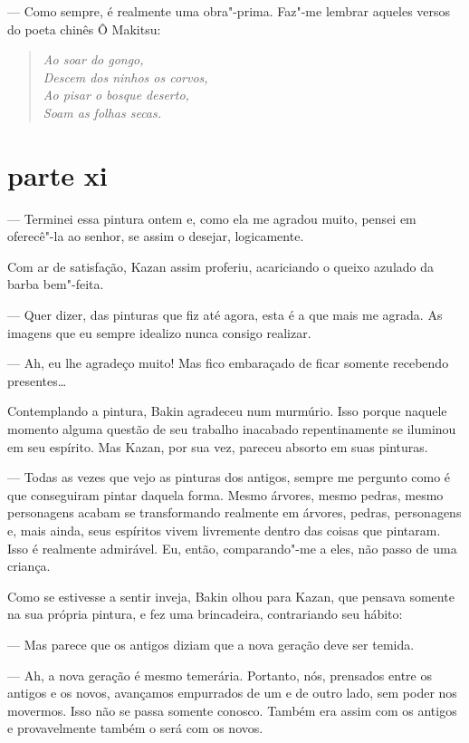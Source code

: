 --- Como sempre, é realmente uma obra"-prima. Faz"-me lembrar aqueles versos
do poeta chinês Ô Makitsu:

\begin{verse}
\textit{Ao soar do gongo,\\
Descem dos ninhos os corvos,\\
Ao pisar o bosque deserto,\\
Soam as folhas secas.}
\end{verse}

\section*{parte xi}

--- Terminei essa pintura ontem e, como ela me agradou muito, pensei em
oferecê"-la ao senhor, se assim o desejar, logicamente.

Com ar de satisfação, Kazan assim proferiu, acariciando o queixo azulado
da barba bem"-feita.

--- Quer dizer, das pinturas que fiz até agora, esta é a que mais me
agrada. As imagens que eu sempre idealizo nunca consigo realizar.

--- Ah, eu lhe agradeço muito! Mas fico embaraçado de ficar somente
recebendo presentes\ldots{}

Contemplando a pintura, Bakin agradeceu num murmúrio. Isso porque
naquele momento alguma questão de seu trabalho inacabado repentinamente
se iluminou em seu espírito. Mas Kazan, por sua vez, pareceu absorto em
suas pinturas.

--- Todas as vezes que vejo as pinturas dos antigos, sempre me pergunto
como é que conseguiram pintar daquela forma. Mesmo árvores, mesmo
pedras, mesmo personagens acabam se transformando realmente em árvores,
pedras, personagens e, mais ainda, seus espíritos vivem livremente
dentro das coisas que pintaram. Isso é realmente admirável. Eu, então,
comparando"-me a eles, não passo de uma criança.

Como se estivesse a sentir inveja, Bakin olhou para Kazan, que pensava
somente na sua própria pintura, e fez uma brincadeira, contrariando seu
hábito:

--- Mas parece que os antigos diziam que a nova geração deve ser temida.

--- Ah, a nova geração é mesmo temerária. Portanto, nós, prensados entre
os antigos e os novos, avançamos empurrados de um e de outro lado, sem
poder nos movermos. Isso não se passa somente conosco. Também era assim
com os antigos e provavelmente também o será com os novos.

